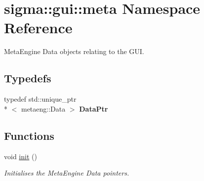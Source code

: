 \hypertarget{namespacesigma_1_1gui_1_1meta}{\section{sigma\-:\-:gui\-:\-:meta Namespace Reference}
\label{namespacesigma_1_1gui_1_1meta}
}


Meta\-Engine Data objects relating to the G\-U\-I.  


\subsection*{Typedefs}
\begin{DoxyCompactItemize}
\item 
\hypertarget{namespacesigma_1_1gui_1_1meta_a3ebac08ff7b464ee6338a52c0c88c9e4}{typedef std\-::unique\-\_\-ptr\\*
$<$ metaeng\-::\-Data $>$ {\bfseries Data\-Ptr}}\label{namespacesigma_1_1gui_1_1meta_a3ebac08ff7b464ee6338a52c0c88c9e4}

\end{DoxyCompactItemize}
\subsection*{Functions}
\begin{DoxyCompactItemize}
\item 
\hypertarget{namespacesigma_1_1gui_1_1meta_a808e2bbfcc83285ac1971be031f5d9cb}{void \hyperlink{namespacesigma_1_1gui_1_1meta_a808e2bbfcc83285ac1971be031f5d9cb}{init} ()}\label{namespacesigma_1_1gui_1_1meta_a808e2bbfcc83285ac1971be031f5d9cb}

\begin{DoxyCompactList}\small\item\em Initialises the Meta\-Engine Data pointers. \end{DoxyCompactList}\end{DoxyCompactItemize}
